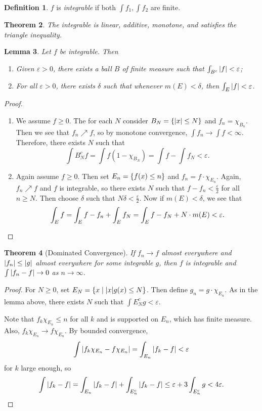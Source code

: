 \documentclass[leqno, openany]{memoir}
\newtheorem{thm}{Theorem}[chapter]
\newtheorem{lem}[thm]{Lemma}
\theoremstyle{definition}
\newtheorem{defn}[thm]{Definition}
\theoremstyle{remark}
\theoremstyle{plain}
\theoremstyle{definition}
\theoremstyle{remark}
\newcommand{\ep}{\varepsilon}
\begin{document}
\begin{defn} $f$ is \textit{integrable} if both $\int f_1, \int f_2$ are
finite.  \end{defn}

\begin{thm} The integrable is linear, additive, monotone, and satisfies the
triangle inequality.  \end{thm}

\begin{lem} Let $f$ be integrable. Then \begin{enumerate} \item Given $\ep >
    0$, there exists a ball $B$ of finite measure such that $\int_{B^c} \abs{f}
    < \ep$; \item For all $\ep > 0$, there exists $\delta$ such that whenever
    $m(E) < \delta$, then $\int_E \abs{f} < \ep$.  \end{enumerate} \end{lem}

\begin{proof} \begin{enumerate} \item We assume $f \geq 0$. The for each $N$
    consider $B_N = \qty{\abs{x} \leq N}$ and $f_n = \chi_{B_n}$. Then we see
    that $f_n \nearrow f$, so by monotone convergence, $\int f_n \to \int f <
    \infty$. Therefore, there exists $N$ such that \[ \int B_N^c f = \int
    f(1-\chi_{B_N}) = \int f - \int f_N < \ep. \] \item Again assume $f \geq
    0$. Then set $E_n = \qty{f(x) \leq n}$ and $f_n = f \cdot \chi_{E_n}$.
    Again, $f_n \nearrow f$ and $f$ is integrable, so there exists $N$ such
    that $f- f_n < \frac{\ep}{2}$ for all $n \geq N$. Then choose $\delta$ such
    that $N \delta < \frac{\ep}{2}$. Now if $m(E) < \delta$, we see that \[
\int_E f = \int_E f-f_n + \int_E f_N = \int_E f-f_N + N \cdot m(E) < \ep.
\qedhere \] \end{enumerate} \end{proof}

\begin{thm}[Dominated Convergence] If $f_n \to f$ almost everywhere and
$\abs{f_n} \leq \abs{g}$ almost everywhere for some integrable $g$, then $f$ is
integrable and $\int \abs{f_n - f} \to 0$ as $n \to \infty$.  \end{thm}

\begin{proof} For $N \geq 0$, set $E_N = \qty{ x \mid \abs{x} g(x) \leq N }$.
    Then define $g_n = g \cdot \chi_{E_n}$. As in the lemma above, there exists
    $N$ such that $\int E_N^c g < \ep$.

    Note that $f_k \chi_{E_n} \leq n$ for all $k$ and is supported on $E_n$,
    which has finite measure. Also, $f_k \chi_{E_n} \to f \chi_{E_n}$. By
    bounded convergence, \[ \int \abs{f_k \chi_{E_n} - f \chi_{E_n}} =
    \int_{E_n} \abs{f_k - f} < \ep \] for $k$ large enough, so \[ \int \abs{f_k
- f} = \int_{E_n} \abs{f_k - f} + \int_{E_n^c} \abs{f_k - f} \leq \ep + 3
\int_{E_n^c} g < 4 \ep. \qedhere \] \end{proof}
\end{document}
